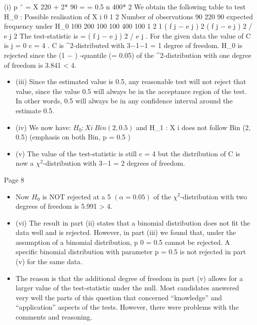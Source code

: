 \documentclass[a4paper,12pt]{article}
\begin{document}
\newpage
(i)
p ˆ =
X 220 + 2* 90
=
= 0.5
n
400* 2
We obtain the following table to test H_{0} :
Possible realisation of X i 0 1 2
Number of observations 90 220 90
expected frequency under H_{0} 100 200 100
100 400 100
1 2 1
( f j − e j ) 2
( f j − e j ) 2 / e j
2
The test-statistic is = \sum ( f j − e j ) 2 / e j . For the given data the value of C is
j = 0
c = 4 .
C is \chi^2-distributed with 3−1−1 = 1 degree of freedom.
H_{0} is rejected since the (1 − \alpha ) -quantile (\alpha = 0.05) of the \chi^2-distribution with
one degree of freedom is 3.841 < 4.
\begin{itemize}
    \item (iii) Since the estimated value is 0.5, any reasonable test will not reject that value,
since the value 0.5 will always be in the acceptance region of the test. In other
words, 0.5 will always be in any confidence interval around the estimate 0.5.
\item (iv) We now have: $H_{0} : X i ~ Bin (2, 0.5)$ and
H_{1} : X i does not follow Bin (2, 0.5) (emphasis on both Bin, p = 0.5 )
\item (v)
The value of the test-statistic is still c = 4 but the distribution of C is now a
$\chi^2$-distribution with 3−1 = 2 degrees of freedom.
\end{itemize}

Page 8%
\begin{itemize}
\item Now $H_{0}$ is NOT rejected at a 5%
$(\alpha = 0.05)$ of the $\chi^2$-distribution with two degrees of freedom is
5.991 > 4.
\item (vi)
The result in part (ii) states that a binomial distribution does not fit the data
well and is rejected. However, in part (iii) we found that, under the assumption
of a binomial distribution, p 0 = 0.5 cannot be rejected. A specific binomial
distribution with parameter p = 0.5 is not rejected in part (v) for the same
data. 
\item The reason is that the additional degree of freedom in part (v) allows for
a larger value of the test-statistic under the null.
Most candidates answered very well the parts of this question that concerned “knowledge”
and “application” aspects of the tests. However, there were problems with the comments and
reasoning.
\end{itemize}
\end{document}
